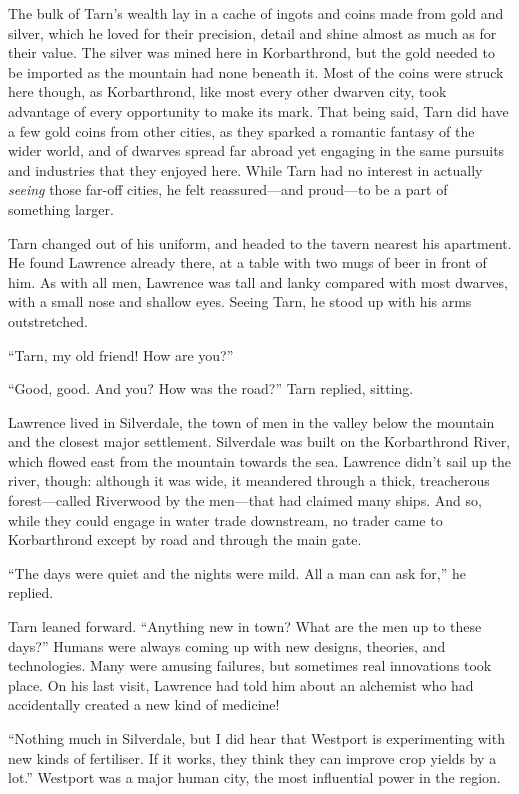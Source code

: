 The bulk of Tarn's wealth lay in a cache of ingots and coins made from gold and silver, which he loved for their precision, detail and shine almost as much as for their value.  The silver was mined here in Korbarthrond, but the gold needed to be imported as the mountain had none beneath it.  Most of the coins were struck here though, as Korbarthrond, like most every other dwarven city, took advantage of every opportunity to make its mark.  That being said, Tarn did have a few gold coins from other cities, as they sparked a romantic fantasy of the wider world, and of dwarves spread far abroad yet engaging in the same pursuits and industries that they enjoyed here.  While Tarn had no interest in actually \emph{seeing} those far-off cities, he felt reassured---and proud---to be a part of something larger.

Tarn changed out of his uniform, and headed to the tavern nearest his apartment.  He found Lawrence already there, at a table with two mugs of beer in front of him.  As with all men, Lawrence was tall and lanky compared with most dwarves, with a small nose and shallow eyes.  Seeing Tarn, he stood up with his arms outstretched.

``Tarn, my old friend!  How are you?''

``Good, good.  And you?  How was the road?'' Tarn replied, sitting.

Lawrence lived in Silverdale, the town of men in the valley below the mountain and the closest major settlement.  Silverdale was built on the Korbarthrond River, which flowed east from the mountain towards the sea.  Lawrence didn't sail up the river, though: although it was wide, it meandered through a thick, treacherous forest---called Riverwood by the men---that had claimed many ships.  And so, while they could engage in water trade downstream, no trader came to Korbarthrond except by road and through the main gate.

``The days were quiet and the nights were mild.  All a man can ask for,'' he replied.


Tarn leaned forward.  ``Anything new in town?  What are the men up to these days?''  Humans were always coming up with new designs, theories, and technologies.  Many were amusing failures, but sometimes real innovations took place.  On his last visit, Lawrence had told him about an alchemist who had accidentally created a new kind of medicine!

``Nothing much in Silverdale, but I did hear that Westport is experimenting with new kinds of fertiliser.  If it works, they think they can improve crop yields by a lot.''  Westport was a major human city, the most influential power in the region.

